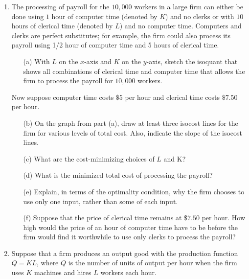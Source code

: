 \documentclass[11pt]{article}
\begin{document}
\begin{enumerate}
  
  \newpage
  \item The processing of payroll for the $10,000$ workers in a large firm can either be done using $1$ hour of computer time (denoted by $K$) and no clerks or with $10$ hours of clerical time (denoted by $L$) and no computer time. Computers and clerks are perfect substitutes; for example, the firm could also process its payroll using 1/2 hour of computer time and 5 hours of clerical time.
  
  \begin{enumerate}
    \item[(a)] With $L$ on the $x$-axis and $K$ on the $y$-axis, sketch the isoquant that shows all combinations of clerical time and computer time that allows the firm to process the payroll for $10,000$ workers.
  \end{enumerate}

  Now suppose computer time costs $\$5$ per hour and clerical time costs $\$7.50$ per hour.

  \begin{enumerate}
    \item[(b)] On the graph from part (a), draw at least three isocost lines for the firm for various levels of total cost. Also, indicate the slope of the isocost lines.

    \newpage
    \item[(c)] What are the cost-minimizing choices of $L$ and K?

    \vspace*{40mm}
    \item[(d)] What is the minimized total cost of processing the payroll?

    \vspace*{40mm}
    \item[(e)] Explain, in terms of the optimality condition, why the firm chooses to use only one input, rather than some of each input.

    \vspace*{40mm}
    \item[(f)] Suppose that the price of clerical time remains at $\$7.50$ per hour. How high would the price of an hour of computer time have to be before the firm would find it worthwhile to use only clerks to process the payroll?
  \end{enumerate}

  \newpage
  \item Suppose that a firm produces an output good with the production function $Q = KL$, where $Q$ is the number of units of output per hour when the firm uses $K$ machines and hires $L$ workers each hour.
  

\end{enumerate}
\end{document}
